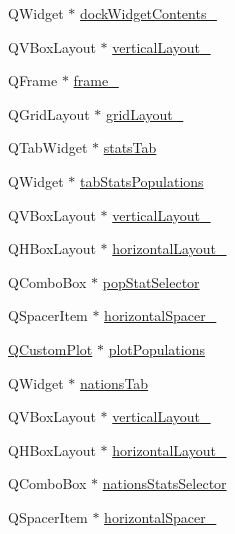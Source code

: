 \begin{DoxyCompactItemize}
\item 
Q\+Widget $\ast$ \mbox{\hyperlink{class_ui___main_window_af54c2ad50aa3702180e8ca2026d34088}{dock\+Widget\+Contents\+\_}}
\item 
Q\+V\+Box\+Layout $\ast$ \mbox{\hyperlink{class_ui___main_window_a38b8a4b887f3b58e2a49e7905ae6f1f0}{vertical\+Layout\+\_}}
\item 
Q\+Frame $\ast$ \mbox{\hyperlink{class_ui___main_window_ab47865bd12cd980e143b3fc06ad24ac1}{frame\+\_}}
\item 
Q\+Grid\+Layout $\ast$ \mbox{\hyperlink{class_ui___main_window_a6b2a0c5f7e8ff2a87134908dd770d2d2}{grid\+Layout\+\_}}
\item 
Q\+Tab\+Widget $\ast$ \mbox{\hyperlink{class_ui___main_window_ae32414d3b73797dd063fb82008f4906d}{stats\+Tab}}
\item 
Q\+Widget $\ast$ \mbox{\hyperlink{class_ui___main_window_a55b77a39b19f6e327b9b1b6395efd66a}{tab\+Stats\+Populations}}
\item 
Q\+V\+Box\+Layout $\ast$ \mbox{\hyperlink{class_ui___main_window_aaa8cc393d5a44562d629a9f646d2c6dd}{vertical\+Layout\+\_}}
\item 
Q\+H\+Box\+Layout $\ast$ \mbox{\hyperlink{class_ui___main_window_a03ce63974cc69b067c91bbf285cceca8}{horizontal\+Layout\+\_}}
\item 
Q\+Combo\+Box $\ast$ \mbox{\hyperlink{class_ui___main_window_ab75055d19adcdc9f84097b25a6a5ca4d}{pop\+Stat\+Selector}}
\item 
Q\+Spacer\+Item $\ast$ \mbox{\hyperlink{class_ui___main_window_a4fc05b11984637298795a354792c4023}{horizontal\+Spacer\+\_}}
\item 
\mbox{\hyperlink{class_q_custom_plot}{Q\+Custom\+Plot}} $\ast$ \mbox{\hyperlink{class_ui___main_window_aa0668a9b48b8534e6afbe0173f9ca305}{plot\+Populations}}
\item 
Q\+Widget $\ast$ \mbox{\hyperlink{class_ui___main_window_a690c2ebc6bbd13962dd65fe21131ccc3}{nations\+Tab}}
\item 
Q\+V\+Box\+Layout $\ast$ \mbox{\hyperlink{class_ui___main_window_afb1464f1d82290bdb55ce9c30a62c2c5}{vertical\+Layout\+\_}}
\item 
Q\+H\+Box\+Layout $\ast$ \mbox{\hyperlink{class_ui___main_window_ae183387a7d233b437a637b403ba39ffd}{horizontal\+Layout\+\_}}
\item 
Q\+Combo\+Box $\ast$ \mbox{\hyperlink{class_ui___main_window_a1978407e9050593f7ea64ea01f695536}{nations\+Stats\+Selector}}
\item 
Q\+Spacer\+Item $\ast$ \mbox{\hyperlink{class_ui___main_window_a71605bcf74c938f64207451850fc69b1}{horizontal\+Spacer\+\_}}

\end{DoxyCompactItemize}
